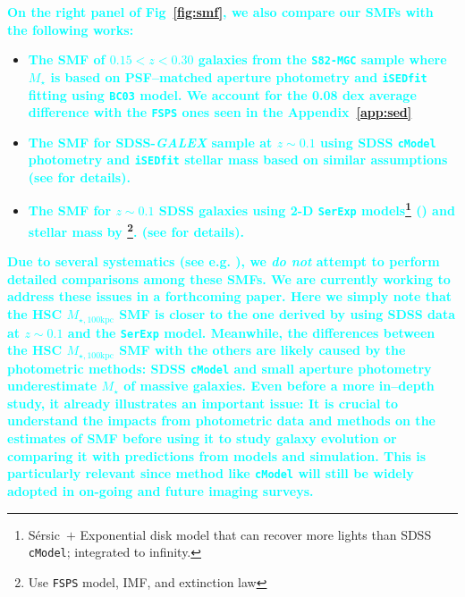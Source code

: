 \documentclass[a4paper,fleqn,usenatbib]{mnras}
\def\ser{{S\'{e}rsic\ }}
\def\cmodel{\texttt{cModel}}
\def\mstar{{$M_{\star}$}}
\def\mtot{{$M_{\star,100\mathrm{kpc}}$}}
\newcommand{\song}[1]{\textcolor{cyan}{\textbf{#1}}}
\begin{document}
    \song{
    On the right panel of Fig~\ref{fig:smf}, we also compare our SMFs with the 
    following works:
    }

    \begin{itemize}

        \item \song{
            The SMF of $0.15 < z < 0.30$ galaxies from the \texttt{S82-MGC} sample
            \citep{Leauthaud2016} where \mstar{} is based on PSF--matched aperture
            photometry and \texttt{iSEDfit} fitting using \texttt{BC03} model.
            We account for the 0.08 dex average difference with the \texttt{FSPS} ones
            seen in the Appendix~\ref{app:sed}
            }
       
        \item \song{
            The SMF for SDSS-\textit{GALEX} sample at $z{\sim} 0.1$ using SDSS \cmodel{}
            photometry and \texttt{iSEDfit} stellar mass based on similar assumptions 
            (see \citet{Moustakas13} for details). 
            }
            
        \item \song{
            The SMF for $z{\sim} 0.1$ SDSS galaxies using 2-D \texttt{SerExp} 
            models\footnote{\ser{}$+$ Exponential disk model that can recover more 
            lights than SDSS \cmodel{}; integrated to infinity.}
            (\citealt{Bernardi2013, Meert2015}) and stellar mass by 
            \citet{Mendel2014}\footnote{Use \texttt{FSPS} model, 
            \citet{Chabrier2003} IMF, and \citet{Calzetti2000} extinction law}.
            (see \citet{Bernardi2017} for details).
            }
            
    \end{itemize}
    
    \song{ 
    Due to several systematics (see e.g. \citealt{Bernardi2013, Bernardi2017}), we 
    \emph{do not} attempt to perform detailed comparisons among these SMFs.
    We are currently working to address these issues in a forthcoming paper. 
    Here we simply note that the HSC \mtot{} SMF is closer to the one 
    derived by \citet{Bernardi2017} using SDSS data at $z{\sim}0.1$ and the 
    \texttt{SerExp} model.
    Meanwhile, the differences between the HSC \mtot{} SMF with the others are 
    likely caused by the photometric methods: SDSS \cmodel{} and small aperture 
    photometry underestimate \mstar{} of massive galaxies.  
    Even before a more in--depth study, it already illustrates an important issue:
    \textbf{It is crucial to understand the impacts from photometric data and 
    methods on the estimates of SMF} before using it to study galaxy evolution or 
    comparing it with predictions from models and simulation. 
    This is particularly relevant since method like \cmodel{} will still be widely 
    adopted in on-going and future imaging surveys.
    } 
    
\end{document}
